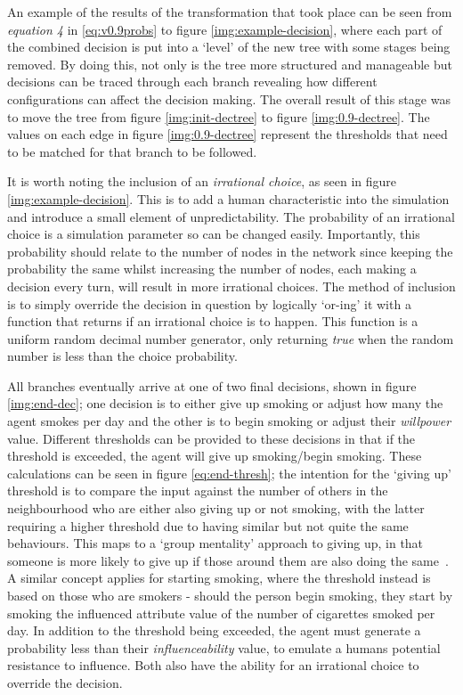 \documentclass[]{report}
\begin{document}
An example of the results of the transformation that took place can be seen from \emph{equation 4} in \ref{eq:v0.9probs} to figure \ref{img:example-decision}, where each part of the combined decision is put into a `level' of the new tree with some stages being removed. By doing this, not only is the tree more structured and manageable but decisions can be traced through each branch revealing how different configurations can affect the decision making. The overall result of this stage was to move the tree from figure \ref{img:init-dectree} to figure \ref{img:0.9-dectree}. The values on each edge in figure \ref{img:0.9-dectree} represent the thresholds that need to be matched for that branch to be followed.

It is worth noting the inclusion of an \emph{irrational choice}, as seen in figure \ref{img:example-decision}. This is to add a human characteristic into the simulation and introduce a small element of unpredictability. The probability of an irrational choice is a simulation parameter so can be changed easily. Importantly, this probability should relate to the number of nodes in the network since keeping the probability the same whilst increasing the number of nodes, each making a decision every turn, will result in more irrational choices. The method of inclusion is to simply override the decision in question by logically `or-ing' it with a function that returns if an irrational choice is to happen. This function is a uniform random decimal number generator, only returning \emph{true} when the random number is less than the choice probability.

All branches eventually arrive at one of two final decisions, shown in figure \ref{img:end-dec}; one decision is to either give up smoking or adjust how many the agent smokes per day and the other is to begin smoking or adjust their \emph{willpower} value. Different thresholds can be provided to these decisions in that if the threshold is exceeded, the agent will give up smoking/begin smoking. These calculations can be seen in figure \ref{eq:end-thresh}; the intention for the `giving up' threshold is to compare the input against the number of others in the neighbourhood who are either also giving up or not smoking, with the latter requiring a higher threshold due to having similar but not quite the same behaviours. This maps to a `group mentality' approach to giving up, in that someone is more likely to give up if those around them are also doing the same~\cite{droves}. A similar concept applies for starting smoking, where the threshold instead is based on those who are smokers - should the person begin smoking, they start by smoking the influenced attribute value of the number of cigarettes smoked per day. In addition to the threshold being exceeded, the agent must generate a probability less than their \emph{influenceability} value, to emulate a humans potential resistance to influence. Both also have the ability for an irrational choice to override the decision.
\end{document}
